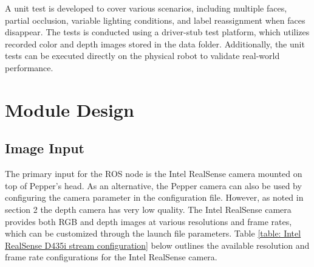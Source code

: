 \documentclass{CSSRforAfrica}
\begin{document}
A unit test is developed to cover various scenarios, including multiple faces, partial occlusion, variable lighting conditions, and label reassignment when faces disappear. The tests is conducted using a driver-stub test platform, which utilizes recorded color and depth images stored in the data folder. Additionally, the unit tests can be executed directly on the physical robot to validate real-world performance.

\newpage
\section{Module Design}
\subsection*{Image Input}
The primary input for the ROS node is the Intel RealSense camera mounted on top of Pepper's head. As an alternative, the Pepper camera can also be used by configuring the camera parameter in the configuration file. However, as noted in section 2 the depth camera has very low quality. The Intel RealSense camera provides both RGB and depth images at various resolutions and frame rates, which can be customized through the launch file parameters. Table \ref{table: Intel RealSense D435i stream configuration} below outlines the available resolution and frame rate configurations for the Intel RealSense camera.
\end{document}
